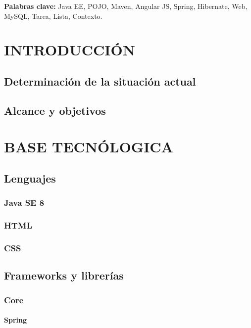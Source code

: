 \documentclass[12pt, a4paper, twoside]{book}
\begin{document}
	
	\textbf{Palabras clave:} Java EE, POJO, Maven, Angular JS, Spring, Hibernate, Web, MySQL, Tarea, Lista, Contexto. 
	
	
	\renewcommand{\contentsname}{Índice de contenidos}
	\renewcommand{\listfigurename}{Índice de figuras}
	\renewcommand{\listtablename}{Índice de tablas}
	
	\tableofcontents %
	
	\listoffigures %
	
	\listoftables %
	
	\clearpage
	
	\chapter{INTRODUCCIÓN}	
	\section{Determinación de la situación actual}
	\section{Alcance y objetivos}
	\chapter{BASE TECNÓLOGICA}
	\section{Lenguajes}
	\subsection{Java SE 8}
	\subsection{HTML}
	\subsection{CSS}
	\section{Frameworks y librerías}
	\subsection{Core}
	\subsubsection{Spring}
\end{document}
